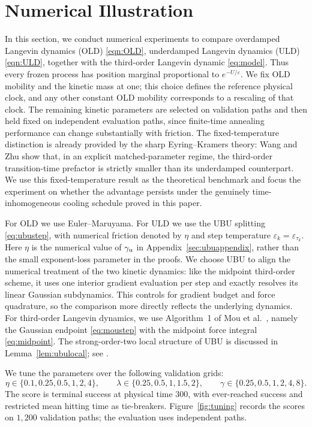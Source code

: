 \documentclass[11pt]{article}
\theoremstyle{definition}
\newcommand{\eps}{\varepsilon}
\begin{document}
\section{Numerical Illustration}\label{sec:numerics}

In this section, we conduct numerical experiments to compare overdamped Langevin dynamics (OLD) \eqref{eqn:OLD}, 
underdamped Langevin dynamics (ULD) \eqref{eqn:ULD}, 
together with the third-order Langevin
dynamic \eqref{eq:model}. Thus every frozen process has position marginal
proportional to $e^{-U/\eps}$. We fix OLD mobility and the kinetic mass at one;
this choice defines the reference physical clock, and any other constant OLD
mobility corresponds to a rescaling of that clock. The remaining kinetic
parameters are selected on validation paths and then held fixed on independent
evaluation paths, since finite-time annealing performance can change substantially
with friction.
The fixed-temperature distinction is already provided by the sharp
Eyring--Kramers theory: Wang and Zhu \cite{WangZhu2026} show that, in an explicit
matched-parameter regime, the third-order transition-time prefactor is strictly
smaller than its underdamped counterpart. We use this fixed-temperature result as
the theoretical benchmark and focus the experiment on whether the advantage
persists under the genuinely time-inhomogeneous cooling schedule proved in this
paper. 

For OLD we use Euler--Maruyama. For ULD we use the UBU splitting
\eqref{eq:ubustep}, with numerical friction denoted by $\eta$ and step
temperature $\eps_k=\eps_{\tau_k}$. Here $\eta$ is the numerical value of
$\gamma_{\rm u}$ in Appendix~\ref{sec:ubuappendix}, rather than the small
exponent-loss parameter in the proofs. We choose
UBU to align the numerical
treatment of the two kinetic dynamics: like the midpoint third-order scheme,
it uses one interior gradient evaluation per step and exactly resolves its
linear Gaussian subdynamics. This controls for gradient budget and force
quadrature, so the comparison more directly reflects the underlying dynamics.
For third-order Langevin dynamics, we use Algorithm~1 of Mou et al.\
\cite{MouEtAl2021}, namely the Gaussian endpoint \eqref{eq:moustep} with the
midpoint force integral \eqref{eq:midpoint}. The strong-order-two local
structure of UBU is discussed in Lemma~\ref{lem:ubulocal}; see
\cite{SanzSernaZygalakis2021,PaulinWhalley2024}.

We tune the parameters over the following validation grids:
\[
 \eta\in\{0.1,0.25,0.5,1,2,4\},\qquad
 \lambda\in\{0.25,0.5,1,1.5,2\},\qquad
 \gamma\in\{0.25,0.5,1,2,4,8\}.
\]
The score is terminal success at physical time $300$, with ever-reached success
and restricted mean hitting time as tie-breakers. Figure~\ref{fig:tuning} records
the scores on $1{,}200$ validation paths; the evaluation uses independent paths.
\end{document}
